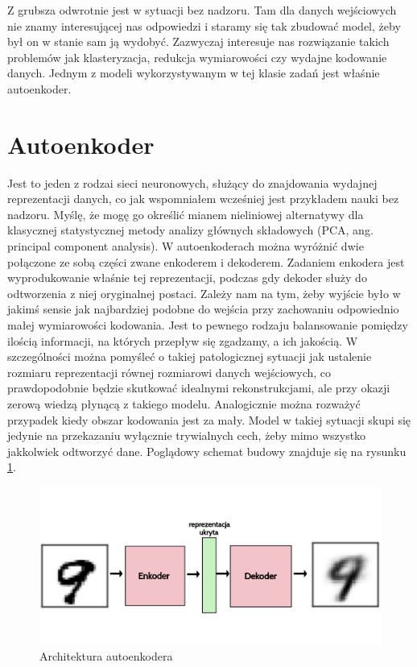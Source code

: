 Z grubsza odwrotnie jest w sytuacji bez nadzoru. Tam dla danych wejściowych nie znamy interesującej nas odpowiedzi i staramy się tak zbudować model, żeby był on w stanie sam ją wydobyć. Zazwyczaj interesuje nas rozwiązanie takich problemów jak klasteryzacja, redukcja wymiarowości czy wydajne kodowanie danych. Jednym z modeli wykorzystywanym w tej klasie zadań jest właśnie autoenkoder.

\section{Autoenkoder}

Jest to jeden z rodzai sieci neuronowych, służący do znajdowania wydajnej reprezentacji danych, co jak wspomniałem wcześniej jest przykładem nauki bez nadzoru. Myślę, że mogę go określić mianem nieliniowej alternatywy dla klasycznej statystycznej metody analizy głównych składowych (PCA, ang. principal component analysis). W autoenkoderach można wyróżnić dwie połączone ze sobą części zwane enkoderem i dekoderem. Zadaniem enkodera jest wyprodukowanie właśnie tej reprezentacji, podczas gdy dekoder służy do odtworzenia z niej oryginalnej postaci. Zależy nam na tym, żeby wyjście było w jakimś sensie jak najbardziej podobne do wejścia przy zachowaniu odpowiednio małej wymiarowości kodowania. Jest to pewnego rodzaju balansowanie pomiędzy ilością informacji, na których przepływ się zgadzamy, a ich jakością. W szczególności można pomyśleć o takiej patologicznej sytuacji jak ustalenie rozmiaru reprezentacji równej rozmiarowi danych wejściowych, co prawdopodobnie będzie skutkować idealnymi rekonstrukcjami, ale przy okazji zerową wiedzą płynącą z takiego modelu. Analogicznie można rozważyć przypadek kiedy obszar kodowania jest za mały. Model w takiej sytuacji skupi się jedynie na przekazaniu wyłącznie trywialnych cech, żeby mimo wszystko jakkolwiek odtworzyć dane. Poglądowy schemat budowy znajduje się na rysunku \ref{fig:autoenc}.

\begin{figure}[h!]
    \centering
    \includegraphics[width=1\textwidth]{images/autoenc}
    \caption{Architektura autoenkodera}
    \label{fig:autoenc}
\end{figure}

